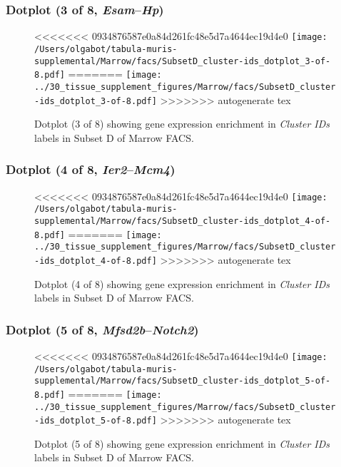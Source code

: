 \clearpage

\subsubsection{Dotplot (3 of 8, \emph{Esam}--\emph{Hp})}
\begin{figure}[h]
\centering
<<<<<<< 0934876587e0a84d261fc48e5d7a4644ec19d4e0
\texttt{[image: /Users/olgabot/tabula-muris-supplemental/Marrow/facs/SubsetD\_cluster-ids\_dotplot\_3-of-8.pdf]}
=======
\texttt{[image: ../30\_tissue\_supplement\_figures/Marrow/facs/SubsetD\_cluster-ids\_dotplot\_3-of-8.pdf]}
>>>>>>> autogenerate tex

\caption{ Dotplot (3 of 8)  showing gene expression enrichment in \emph{Cluster IDs} labels in Subset D of Marrow FACS. }
\end{figure}


\clearpage

\subsubsection{Dotplot (4 of 8, \emph{Ier2}--\emph{Mcm4})}
\begin{figure}[h]
\centering
<<<<<<< 0934876587e0a84d261fc48e5d7a4644ec19d4e0
\texttt{[image: /Users/olgabot/tabula-muris-supplemental/Marrow/facs/SubsetD\_cluster-ids\_dotplot\_4-of-8.pdf]}
=======
\texttt{[image: ../30\_tissue\_supplement\_figures/Marrow/facs/SubsetD\_cluster-ids\_dotplot\_4-of-8.pdf]}
>>>>>>> autogenerate tex

\caption{ Dotplot (4 of 8)  showing gene expression enrichment in \emph{Cluster IDs} labels in Subset D of Marrow FACS. }
\end{figure}


\clearpage

\subsubsection{Dotplot (5 of 8, \emph{Mfsd2b}--\emph{Notch2})}
\begin{figure}[h]
\centering
<<<<<<< 0934876587e0a84d261fc48e5d7a4644ec19d4e0
\texttt{[image: /Users/olgabot/tabula-muris-supplemental/Marrow/facs/SubsetD\_cluster-ids\_dotplot\_5-of-8.pdf]}
=======
\texttt{[image: ../30\_tissue\_supplement\_figures/Marrow/facs/SubsetD\_cluster-ids\_dotplot\_5-of-8.pdf]}
>>>>>>> autogenerate tex

\caption{ Dotplot (5 of 8)  showing gene expression enrichment in \emph{Cluster IDs} labels in Subset D of Marrow FACS. }
\end{figure}


